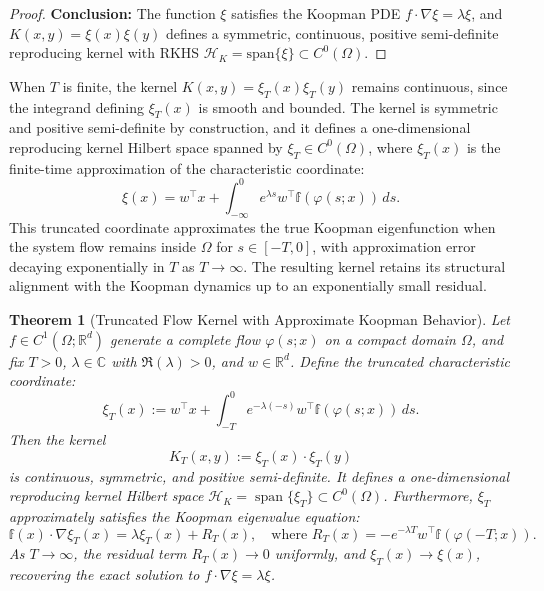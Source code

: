 \documentclass[11pt]{article}
\theoremstyle{plain}
\newtheorem{theorem}{Theorem}[section]
\def\[{\begin{equation}}
\def\]{\end{equation}}
\begin{document}
\begin{proof}
\textbf{Conclusion:} The function \( \xi \) satisfies the Koopman PDE \( f \cdot \nabla \xi = \lambda \xi \), and \( K(x, y) = \xi(x) \xi(y) \) defines a symmetric, continuous, positive semi-definite reproducing kernel with RKHS \( \mathcal{H}_K = \text{span}\{\xi\} \subset C^0(\Omega) \).  
\end{proof}

When \( T \) is finite, the kernel \( K(x, y) = \xi_T(x) \xi_T(y) \) remains continuous, since the integrand defining \( \xi_T(x) \) is smooth and bounded. The kernel is symmetric and positive semi-definite by construction, and it defines a one-dimensional reproducing kernel Hilbert space spanned by \( \xi_T \in C^0(\Omega) \), where \( \xi_T(x) \) is the finite-time approximation of the characteristic coordinate:
\[
\xi(x) = w^\top x + \int_{-\infty}^0 e^{\lambda s} w^\top {\mathbb f}(\varphi(s; x)) \, ds.
\]
This truncated coordinate approximates the true Koopman eigenfunction when the system flow remains inside \( \Omega \) for \( s \in [-T, 0] \), with approximation error decaying exponentially in \( T \) as \( T \to \infty \). The resulting kernel retains its structural alignment with the Koopman dynamics up to an exponentially small residual.
\begin{theorem}[Truncated Flow Kernel with Approximate Koopman Behavior]
\label{thm:truncated-characteristic-kernel}
Let \( f \in C^1(\Omega; \mathbb{R}^d) \) generate a complete flow \( \varphi(s; x) \) on a compact domain \( \Omega \), and fix \( T > 0 \), \( \lambda \in \mathbb{C} \) with \( \Re(\lambda) > 0 \), and \( w \in \mathbb{R}^d \). Define the truncated characteristic coordinate:
\[
\xi_T(x) := w^\top x + \int_{-T}^0 e^{-\lambda(-s)} w^\top {\mathbb f}(\varphi(s; x)) \, ds.
\]
Then the kernel
\[
K_T(x, y) := \xi_T(x) \cdot \xi_T(y)
\]
is continuous, symmetric, and positive semi-definite. It defines a one-dimensional reproducing kernel Hilbert space \( \mathcal{H}_K = \operatorname{span}\{\xi_T\} \subset C^0(\Omega) \). Furthermore, \( \xi_T \) approximately satisfies the Koopman eigenvalue equation:
\[
{\mathbb f}(x) \cdot \nabla \xi_T(x) = \lambda \xi_T(x) + R_T(x),
\quad
\text{where } R_T(x) = -e^{-\lambda T} w^\top {\mathbb f}(\varphi(-T; x)).
\]
As \( T \to \infty \), the residual term \( R_T(x) \to 0 \) uniformly, and \( \xi_T(x) \to \xi(x) \), recovering the exact solution to \( f \cdot \nabla \xi = \lambda \xi \).
\end{theorem}
\end{document}
